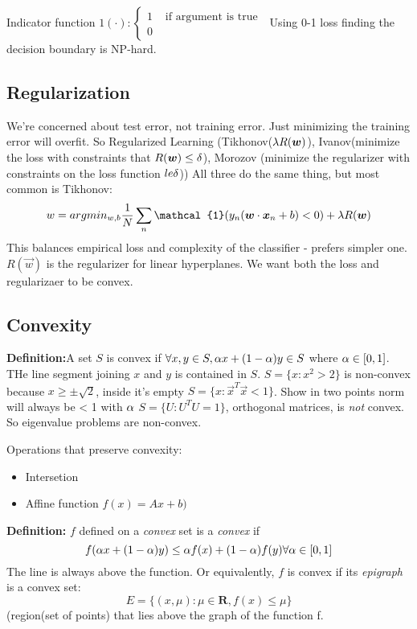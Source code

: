 Indicator function $\mathcal{1}(\cdot):
\begin{cases}
  1 & \text{ if argument is true }\\ 0
\end{cases}
$ Using 0-1 loss finding the decision boundary is NP-hard.

\subsection{Regularization}
\label{sec:regularization}

We're concerned about test error, not training error. Just minimizing
the training error will overfit. So Regularized Learning
(Tikhonov($\lambda R(\boldsymbol{w})$),
Ivanov(minimize the loss with constraints that $R(\boldsymbol{w}) \le \delta$), Morozov
(minimize the regularizer with constraints on the loss function $le \delta$)) All
three do the same thing, but most common is Tikhonov:
$$w = argmin_{w,b} \frac{1}{N}\sum_n\mathcal{1}(y_n(\vec w\cdot \vec
x_n + b) < 0) + \lam R(\vec w)$$
This balances empirical loss and complexity of the classifier -
prefers simpler one. $R(\vec w)$ is the regularizer for linear hyperplanes.
We want both the loss and regularizaer to be convex.

\subsection{Convexity}
\label{sec:convexity}

\textbf{Definition:}A set $S$ is convex if $\forall x,y\in S, \alpha x + (1-\alpha)y \in S$ where
$\alpha\in [0,1]$. THe line segment joining $x$ and $y$ is contained in
$S$.
$S=\{x:x^2 > 2\}$ is non-convex because $x\ge \pm\sqrt{2}$, inside
it's empty
$S=\{x: \vec x^T \vec x < 1\}$. Show in two points norm will always be
< 1 with $\alpha$
$S=\{U: U^T U = 1\}$, orthogonal matrices, is\emph{ not }convex. So
eigenvalue problems are non-convex.

Operations that preserve convexity:
\begin{itemize}
\item Intersetion
\item Affine function $f(x)=Ax+b)$
\end{itemize}

\textbf{Definition:} $f$ defined on a \emph{convex} set is a
\emph{convex} if 
$$f(\alpha x + (1-\alpha)y) \le \alpha f(x) + (1-\alpha)f(y) \forall \alpha \in
[0,1]$$
The line is always above the function. Or equivalently, $f$ is convex if its \emph{epigraph} is a convex set:
$$E=\{(x,\mu):\mu \in \mathbf{R}, f(x)\le \mu\}$$ (region(set of points) that lies
above the graph of the function f.

